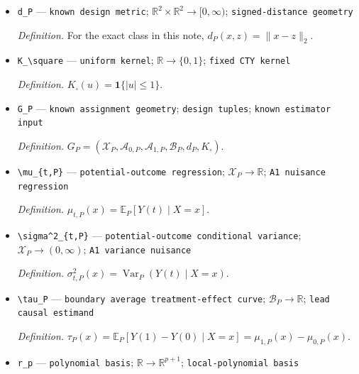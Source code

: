 \documentclass{article}
\begin{document}
\begin{itemize}
  \par\smallskip\noindent\emph{Definition.} \(\mathcal B_P=\operatorname{bd}(\mathcal A_{0,P})\cap\operatorname{bd}(\mathcal A_{1,P})\subset\operatorname{int}(\mathcal X_P)\).
  \item \texttt{d\_\allowbreak{}P} --- \texttt{known design metric}; \(\mathbb R^2\times\mathbb R^2\to[0,\infty)\); \texttt{signed-\allowbreak{}distance geometry}
  \par\smallskip\noindent\emph{Definition.} For the exact class in this note, \(d_P(x,z)=\lVert x-z\rVert_2\).
  \item \texttt{K\_\allowbreak{}\textbackslash{}\allowbreak{}square} --- \texttt{uniform kernel}; \(\mathbb R\to\{0,1\}\); \texttt{fixed CTY kernel}
  \par\smallskip\noindent\emph{Definition.} \(K_\square(u)=\mathbf1\{|u|\leq1\}\).
  \item \texttt{G\_\allowbreak{}P} --- \texttt{known assignment geometry}; \texttt{design tuples}; \texttt{known estimator input}
  \par\smallskip\noindent\emph{Definition.} \(G_P=(\mathcal X_P,\mathcal A_{0,P},\mathcal A_{1,P},\mathcal B_P,d_P,K_\square)\).
  \item \texttt{\textbackslash{}\allowbreak{}mu\_\allowbreak{}\{t,\allowbreak{}P\}\allowbreak{}} --- \texttt{potential-\allowbreak{}outcome regression}; \(\mathcal X_P\to\mathbb R\); \texttt{A1 nuisance regression}
  \par\smallskip\noindent\emph{Definition.} \(\mu_{t,P}(x)=\mathbb E_P[Y(t)\mid X=x]\).
  \item \texttt{\textbackslash{}\allowbreak{}sigma\textasciicircum{}2\_\allowbreak{}\{t,\allowbreak{}P\}\allowbreak{}} --- \texttt{potential-\allowbreak{}outcome conditional variance}; \(\mathcal X_P\to(0,\infty)\); \texttt{A1 variance nuisance}
  \par\smallskip\noindent\emph{Definition.} \(\sigma^2_{t,P}(x)=\operatorname{Var}_P(Y(t)\mid X=x)\).
  \item \texttt{\textbackslash{}\allowbreak{}tau\_\allowbreak{}P} --- \texttt{boundary average treatment-\allowbreak{}effect curve}; \(\mathcal B_P\to\mathbb R\); \texttt{lead causal estimand}
  \par\smallskip\noindent\emph{Definition.} \(\tau_P(x)=\mathbb E_P[Y(1)-Y(0)\mid X=x]=\mu_{1,P}(x)-\mu_{0,P}(x)\).
  \item \texttt{r\_\allowbreak{}p} --- \texttt{polynomial basis}; \(\mathbb R\to\mathbb R^{p+1}\); \texttt{local-\allowbreak{}polynomial basis}

\end{itemize}
\end{document}
